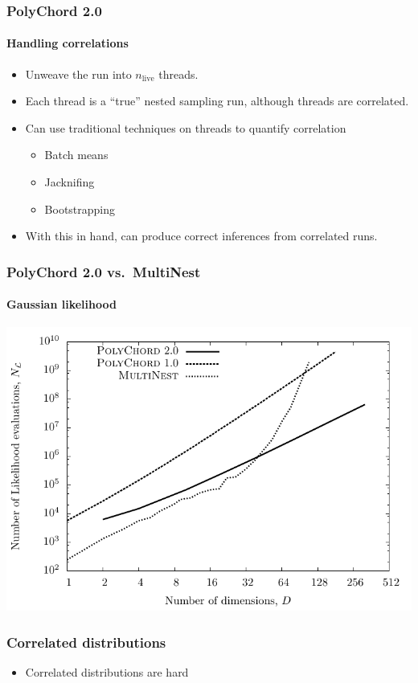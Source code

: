 \documentclass[]{beamer}
\newcommand{\nlive}{n_\mathrm{live}}
\begin{document}
\begin{frame}
  \frametitle{PolyChord 2.0}
  \framesubtitle{Handling correlations}

  \begin{itemize}
    \pause\item Unweave the run into $\nlive$ threads.
    \pause\item Each thread is a ``true'' nested sampling run, although threads are correlated.
    \pause\item Can use traditional techniques on threads to quantify correlation 
      \begin{itemize}
        \pause\item Batch means
        \item Jacknifing
        \item Bootstrapping
      \end{itemize}
    \pause\item With this in hand, can produce correct inferences from correlated runs.
  \end{itemize}

\end{frame}

\begin{frame}
  \frametitle{PolyChord 2.0 vs.\ MultiNest}
  \framesubtitle{Gaussian likelihood}
  \includegraphics[width=\textwidth]{figures/polychord_vs_multinest_1.pdf}
\end{frame}


\begin{frame}
  \frametitle{Correlated distributions}
  \begin{itemize}
    \pause\item Correlated distributions are hard
  \end{itemize}
\end{frame}
\end{document}
